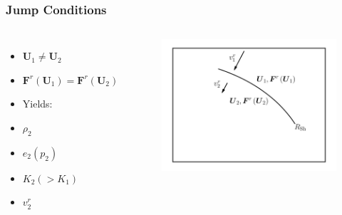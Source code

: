 \documentclass{beamer}
\newcommand{\bs}{\boldsymbol}
\begin{document}
\begin{frame}
\frametitle{Jump Conditions}

  \begin{columns}[c]


      \begin{itemize}
        \item[]
          $\bs{U}_{1}\neq\bs{U}_{2}$
        \item[]
          $\bs{F}^{r}\left(\bs{U}_{1}\right)
          =\bs{F}^{r}\left(\bs{U}_{2}\right)$
        \item[]
          Yields:
        \item[]
          $\rho_{2}$
        \item[]
          $e_{2}\left(p_{2}\right)$
        \item[]
          $K_{2}\left(>K_{1}\right)$
        \item[]
          $v^{r}_{2}$
      \end{itemize}


      \begin{figure}[htb!]
        \centering
        \includegraphics[width=\textwidth]{jump.png}
      \end{figure}

  \end{columns}

\end{frame}
\end{document}
